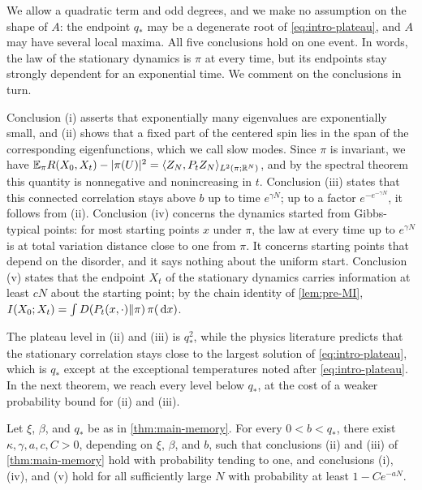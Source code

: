 We allow a quadratic term and odd degrees, and we make no assumption on the shape of $A$: the endpoint $q_*$ may be a degenerate root of \eqref{eq:intro-plateau}, and $A$ may have several local maxima. All five conclusions hold on one event. In words, the law of the stationary dynamics is $\pi$ at every time, but its endpoints stay strongly dependent for an exponential time. We comment on the conclusions in turn.

Conclusion (i) asserts that exponentially many eigenvalues are exponentially small, and (ii) shows that a fixed part of the centered spin lies in the span of the corresponding eigenfunctions, which we call slow modes. Since $\pi$ is invariant, we have $\mathbb E_\pi R(X_0,X_t)-|\pi(U)|^2=\langle Z_N,P_tZ_N\rangle_{L^2(\pi;\mathbb R^N)}$, and by the spectral theorem this quantity is nonnegative and nonincreasing in $t$. Conclusion (iii) states that this connected correlation stays above $b$ up to time $e^{\gamma N}$; up to a factor $e^{-e^{-\gamma N}}$, it follows from (ii). Conclusion (iv) concerns the dynamics started from Gibbs-typical points: for most starting points $x$ under $\pi$, the law at every time up to $e^{\gamma N}$ is at total variation distance close to one from $\pi$. It concerns starting points that depend on the disorder, and it says nothing about the uniform start. Conclusion (v) states that the endpoint $X_t$ of the stationary dynamics carries information at least $cN$ about the starting point; by the chain identity of \cref{lem:pre-MI}, $I(X_0;X_t)=\int D(P_t(x,\cdot)\Vert\pi)\,\pi(\,\mathrm d x)$.

The plateau level in (ii) and (iii) is $q_*^2$, while the physics literature predicts that the stationary correlation stays close to the largest solution of \eqref{eq:intro-plateau}, which is $q_*$ except at the exceptional temperatures noted after \eqref{eq:intro-plateau}. In the next theorem, we reach every level below $q_*$, at the cost of a weaker probability bound for (ii) and (iii).

\begin{theorem}\label{thm:main-plateau}
Let $\xi$, $\beta$, and $q_*$ be as in \cref{thm:main-memory}. For every $0<b<q_*$, there exist $\kappa,\gamma,a,c,C>0$, depending on $\xi$, $\beta$, and $b$, such that conclusions (ii) and (iii) of \cref{thm:main-memory} hold with probability tending to one, and conclusions (i), (iv), and (v) hold for all sufficiently large $N$ with probability at least $1-Ce^{-aN}$.
\end{theorem}

